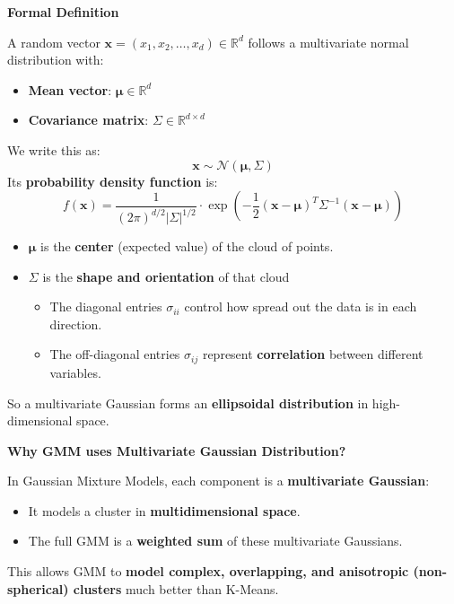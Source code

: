 \begin{remarkbox}
    \highspace
    \begin{flushleft}
        \textcolor{Green3}{ \textbf{Formal Definition}}
    \end{flushleft}
    A random vector $\mathbf{x} = \left(x_{1}, x_{2}, \dots, x_{d}\right) \in \mathbb{R}^{d}$ follows a multivariate normal distribution with:
    \begin{itemize}
        \item \textbf{Mean vector}: $\boldsymbol{\mu} \in \mathbb{R}^{d}$
        \item \textbf{Covariance matrix}: $\Sigma \in \mathbb{R}^{d \times d}$
    \end{itemize}
    We write this as:
    \begin{equation}
        \mathbf{x} \sim \mathcal{N}\left(\boldsymbol{\mu}, \Sigma\right)
    \end{equation}
    Its \textbf{probability density function} is:
    \begin{equation}
        f(\mathbf{x}) = \frac{1}{\left(2\pi\right)^{d/2} \left|\Sigma\right|^{1/2}} \cdot \exp\left( -\frac{1}{2} \left(\mathbf{x} - \boldsymbol{\mu}\right)^{T} \Sigma^{-1} \left(\mathbf{x} - \boldsymbol{\mu}\right) \right)
    \end{equation}
    \begin{itemize}
        \item $\boldsymbol{\mu}$ is the \textbf{center} (expected value) of the cloud of points.
        \item $\Sigma$ is the \textbf{shape and orientation} of that cloud
        \begin{itemize}
            \item The diagonal entries $\sigma_{ii}$ control how spread out the data is in each direction.
            \item The off-diagonal entries $\sigma_{ij}$ represent \textbf{correlation} between different variables.
        \end{itemize}
    \end{itemize}
    So a multivariate Gaussian forms an \textbf{ellipsoidal distribution} in high-dimensional space.
\end{remarkbox}

\begin{flushleft}
    \textcolor{Green3}{ \textbf{Why GMM uses Multivariate Gaussian Distribution?}}
\end{flushleft}
In Gaussian Mixture Models, each component is a \textbf{multivariate Gaussian}:
\begin{itemize}
    \item It models a cluster in \textbf{multidimensional space}.
    \item The full GMM is a \textbf{weighted sum} of these multivariate Gaussians.
\end{itemize}
This allows GMM to \textbf{model complex, overlapping, and anisotropic (non-spherical) clusters} much better than K-Means.


